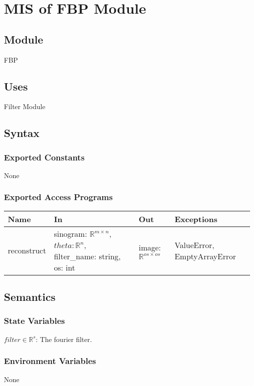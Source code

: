 \documentclass[12pt, titlepage]{article}
\begin{document}
\newpage

\section{MIS of FBP Module} \label{Module}

\subsection{Module}
FBP

\subsection{Uses}
Filter Module

\subsection{Syntax}

\subsubsection{Exported Constants}
None

\subsubsection{Exported Access Programs}

\begin{center}
\begin{tabular}{|l|m{18em}|l|l|}
\hline
\textbf{Name} & \textbf{In} & \textbf{Out} & \textbf{Exceptions} \\
\hline
reconstruct & sinogram: \(\mathbb{R}^{m \times n}\), \(theta: \mathbb{R}^{n}\), filter\_name: string, os: int & image: \(\mathbb{R}^{os \times os}\)& ValueError, EmptyArrayError\\
\hline
\end{tabular}
\end{center}

\subsection{Semantics}

\subsubsection{State Variables}
\(filter \in \mathbb{R}^{s}\): The fourier filter.

\subsubsection{Environment Variables}
None
\end{document}
